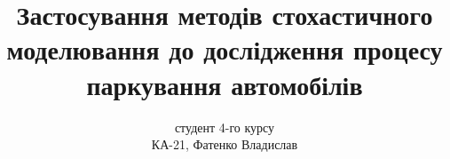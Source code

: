 \author{студент 4-го курсу\\ КА-21, Фатенко Владислав}
\title[Стохастичне моделювання паркінгу]{Застосування методів стохастичного моделювання до дослідження процесу паркування автомобілів}
\date{}

